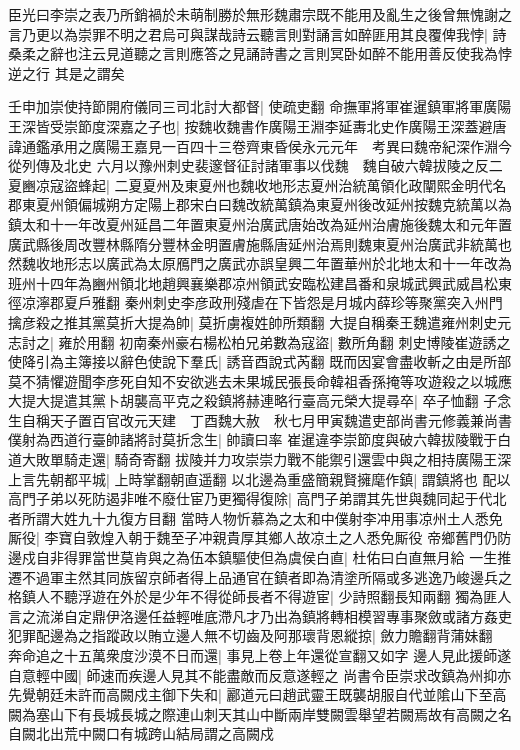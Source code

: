 臣光曰李崇之表乃所銷禍於未萌制勝於無形魏肅宗既不能用及亂生之後曾無愧謝之言乃更以為崇罪不明之君烏可與謀哉詩云聽言則對誦言如醉匪用其良覆俾我悖|{
	詩桑柔之辭也注云見道聽之言則應答之見誦詩書之言則冥卧如醉不能用善反使我為悖逆之行}
其是之謂矣

壬申加崇使持節開府儀同三司北討大都督|{
	使疏吏翻}
命撫軍將軍崔暹鎮軍將軍廣陽王深皆受崇節度深嘉之子也|{
	按魏收魏書作廣陽王淵李延夀北史作廣陽王深蓋避唐諱通鑑承用之廣陽王嘉見一百四十三卷齊東昏侯永元元年　考異曰魏帝紀深作淵今從列傳及北史}
六月以豫州刺史裴邃督征討諸軍事以伐魏　魏自破六韓拔陵之反二夏豳凉寇盜蜂起|{
	二夏夏州及東夏州也魏收地形志夏州治統萬領化政闡熙金明代名郡東夏州領偏城朔方定陽上郡宋白曰魏改統萬鎮為東夏州後改延州按魏克統萬以為鎮太和十一年改夏州延昌二年置東夏州治廣武唐始改為延州治膚施後魏太和元年置廣武縣後周改豐林縣隋分豐林金明置膚施縣唐延州治焉則魏東夏州治廣武非統萬也然魏收地形志以廣武為太原鴈門之廣武亦誤皇興二年置華州於北地太和十一年改為班州十四年為豳州領北地趙興襄樂郡凉州領武安臨松建昌番和泉城武興武威昌松東徑凉濘郡夏戶雅翻}
秦州刺史李彦政刑殘虐在下皆怨是月城内薛珍等聚黨突入州門擒彦殺之推其黨莫折大提為帥|{
	莫折虜複姓帥所類翻}
大提自稱秦王魏遣雍州刺史元志討之|{
	雍於用翻}
初南秦州豪右楊松柏兄弟數為寇盜|{
	數所角翻}
刺史博陵崔遊誘之使降引為主簿接以辭色使說下羣氏|{
	誘音酉說式芮翻}
既而因宴會盡收斬之由是所部莫不猜懼遊聞李彦死自知不安欲逃去未果城民張長命韓祖香孫掩等攻遊殺之以城應大提大提遣其黨卜胡襲高平克之殺鎮將赫連略行臺高元榮大提尋卒|{
	卒子恤翻}
子念生自稱天子置百官改元天建　丁酉魏大赦　秋七月甲寅魏遣吏部尚書元修義兼尚書僕射為西道行臺帥諸將討莫折念生|{
	帥讀曰率}
崔暹違李崇節度與破六韓拔陵戰于白道大敗單騎走還|{
	騎奇寄翻}
拔陵并力攻崇崇力戰不能禦引還雲中與之相持廣陽王深上言先朝都平城|{
	上時掌翻朝直遥翻}
以北邊為重盛簡親賢擁麾作鎮|{
	謂鎮將也}
配以高門子弟以死防遏非唯不廢仕宦乃更獨得復除|{
	高門子弟謂其先世與魏同起于代北者所謂大姓九十九復方目翻}
當時人物忻慕為之太和中僕射李冲用事凉州土人悉免厮役|{
	李寶自敦煌入朝于魏至子冲親貴厚其鄉人故凉土之人悉免厮役}
帝鄉舊門仍防邊戍自非得罪當世莫肯與之為伍本鎮驅使但為虞侯白直|{
	杜佑曰白直無月給}
一生推遷不過軍主然其同族留京師者得上品通官在鎮者即為清塗所隔或多逃逸乃峻邊兵之格鎮人不聽浮遊在外於是少年不得從師長者不得遊宦|{
	少詩照翻長知兩翻}
獨為匪人言之流涕自定鼎伊洛邊任益輕唯底滯凡才乃出為鎮將轉相模習專事聚斂或諸方姦吏犯罪配邊為之指蹤政以賄立邊人無不切齒及阿那瓌背恩縱掠|{
	斂力贍翻背蒲妹翻}
奔命追之十五萬衆度沙漠不日而還|{
	事見上卷上年還從宣翻又如字}
邊人見此援師遂自意輕中國|{
	師速而疾邊人見其不能盡敵而反意遂輕之}
尚書令臣崇求改鎮為州抑亦先覺朝廷未許而高闕戍主御下失和|{
	酈道元曰趙武靈王既襲胡服自代並隂山下至高闕為塞山下有長城長城之際連山刺天其山中斷兩岸雙闕雲舉望若闕焉故有高闕之名自闕北出荒中闕口有城跨山結局謂之高闕戍}
